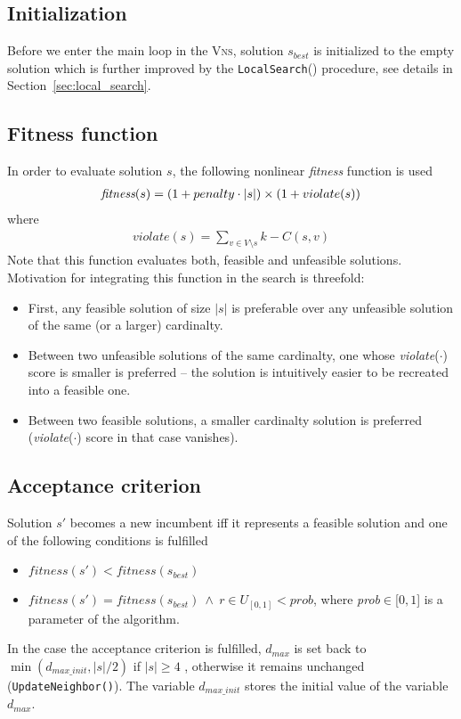 \documentclass[dvipsnames,format=sigconf,anonymous=true,review=true]{acmart}
\begin{document}
    \subsection{Initialization}
      Before we enter the main loop in the \textsc{Vns}, solution $s_{best}$ is initialized to the empty solution    which is further improved by the \texttt{LocalSearch}() procedure, see details in Section~\ref{sec:local_search}. 
 
   \subsection{Fitness function}
       In order to evaluate solution $s$, the following nonlinear \emph{fitness} function is used 
       \begin{align}\label{eq:fitness}
          \emph{fitness}(s) = ( 1+ penalty \cdot |s|) \times ( 1 + violate(s))
       \end{align}
       where 
       \begin{align}
       	   violate(s) = \sum_{v \in V \setminus s}   k - C(s, v)  
       \end{align}
   Note that this function evaluates both, feasible and unfeasible solutions. 
       Motivation for integrating this function  in the search is threefold:
       \begin{itemize}
       	\item First, any feasible solution of size $|s|$ is preferable over any unfeasible solution of the same (or a larger) cardinalty. 
       	\item Between two unfeasible solutions of the same cardinalty, one whose \emph{violate}($\cdot$) score is smaller is preferred -- the solution is intuitively easier to be recreated into a feasible one.  
       	\item Between two feasible solutions, a smaller cardinalty solution is preferred (\emph{violate}($\cdot$) score in that case vanishes). 
       \end{itemize}
   
   \subsection{Acceptance criterion}
   
   Solution $s'$ becomes a new incumbent iff it represents a feasible solution and  one of the following conditions is fulfilled
   \begin{itemize}
   	\item $fitness(s') < fitness(s_{best})$ 
   	\item  $fitness(s') = fitness(s_{best})\  \wedge\ r \in U_{\left[0, 1\right]} <  prob  $, where \emph{prob}$\in$[$0,1$] is a parameter of the algorithm.
   \end{itemize}
    In the case the acceptance criterion is fulfilled, $d_{max}$ is set back to $\min(d_{max\_init}, |s|/2)$ if $|s|\geq4$ , otherwise it remains unchanged (\texttt{UpdateNeighbor()}). The variable $d_{max\_init}$ stores the initial value of the variable $d_{max}$.
   
\end{document}
